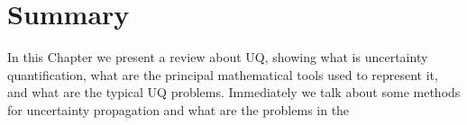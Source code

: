 %

\section{Summary}\label{sec:background_summary}
In this Chapter we present a review about UQ, showing what is uncertainty quantification, what are the principal mathematical tools used to represent it, and what are the typical UQ problems. Immediately we talk about some methods for uncertainty propagation and what are the problems in the 

